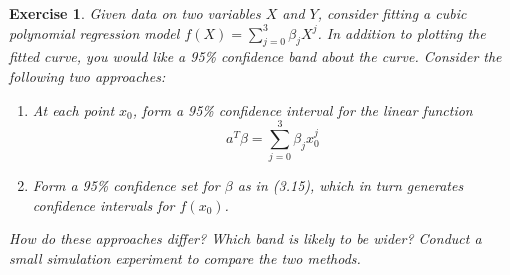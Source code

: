\documentclass[12pt]{article}
\newtheorem{exercise}{Exercise}[section]
\begin{document}
\begin{exercise} Given data on two variables $X$ and $Y$, consider fitting a cubic
polynomial regression model $f(X) = \sum_{j = 0}^3 \beta_j X^j$. In addition to plotting
the fitted curve, you would like a 95\% confidence band about the curve. Consider the following two approaches:
\begin{enumerate}
\item  At each point $x_0$, form a 95\% confidence interval for  the linear function $$a^T \beta = \sum_{j = 0}^3 \beta_j x_0^j$$

\item Form a 95\% confidence set for $\beta$ as in (3.15), which in turn generates
confidence intervals for $f(x_0)$.
\end{enumerate}
How do these approaches differ? Which band is likely to be wider? Conduct
a small simulation experiment to compare the two methods.
\end{exercise} 
\end{document}
